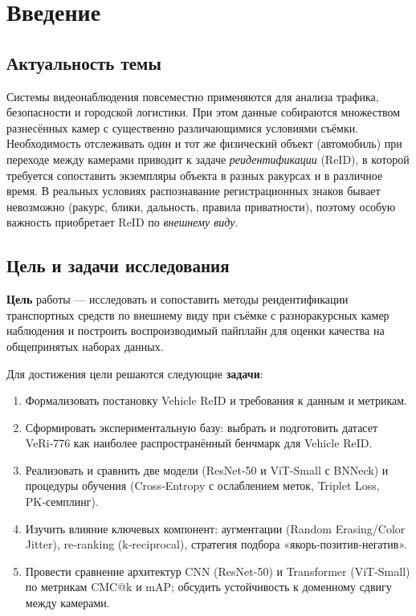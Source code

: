 {\huge\chapter{Введение}}
\label{sec:Chapter0} 

\section{Актуальность темы}
Системы видеонаблюдения повсеместно применяются для анализа трафика, безопасности и городской логистики. При этом данные собираются множеством разнесённых камер с существенно различающимися условиями съёмки. Необходимость отслеживать один и тот же физический объект (автомобиль) при переходе между камерами приводит к задаче \emph{реидентификации} (ReID), в которой требуется сопоставить экземпляры объекта в разных ракурсах и в различное время. В реальных условиях распознавание регистрационных знаков бывает невозможно (ракурс, блики, дальность, правила приватности), поэтому особую важность приобретает ReID по \emph{внешнему виду}.

\section{Цель и задачи исследования}
\textbf{Цель} работы — исследовать и сопоставить методы реидентификации транспортных средств по внешнему виду при съёмке с разноракурсных камер наблюдения и построить воспроизводимый пайплайн для оценки качества на общепринятых наборах данных.

Для достижения цели решаются следующие \textbf{задачи}:
\begin{enumerate}
  \item Формализовать постановку Vehicle ReID и требования к данным и метрикам.
  \item Сформировать экспериментальную базу: выбрать и подготовить датасет VeRi‑776 как наиболее распространённый бенчмарк для Vehicle ReID.
  \item Реализовать и сравнить две модели (ResNet-50 и ViT-Small с BNNeck) и процедуры обучения (Cross‑Entropy с ослаблением меток, Triplet Loss, PK‑семплинг).
  \item Изучить влияние ключевых компонент: аугментации (Random Erasing/Color Jitter), re‑ranking (k‑reciprocal), стратегия подбора «якорь‑позитив‑негатив».
  \item Провести сравнение архитектур CNN (ResNet-50) и Transformer (ViT-Small) по метрикам CMC@k и mAP; обсудить устойчивость к доменному сдвигу между камерами.
\end{enumerate}

